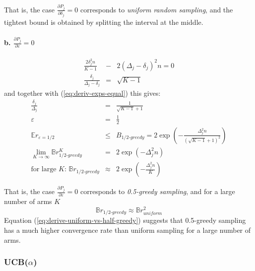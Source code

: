 \documentclass{article}
\newcommand {\IE} {\ensuremath {\mathbb{E}}}
\begin{document}
That is, the case $\frac {\partial P_j} {\partial \delta_j}=0$
corresponds to \emph{uniform random sampling}, and the tightest bound is obtained
by splitting the interval at the middle.


\paragraph{b. {\large $\frac {\partial P_j} {\partial \varepsilon}=0$}}

\begin{eqnarray*}
\frac {2\delta_j^2 n} {K-1}
  &-& 2(\Delta_j-\delta_j)^2n=0\\
\frac {\delta_j} {\Delta_j-\delta_j}&=&\sqrt {K-1}
\end{eqnarray*}
and together with (\ref{eq:deriv-exps-equal}) this gives:
\begin{eqnarray}
\frac {\delta_j} {\Delta_j}&=&\frac 1 {\sqrt {K-1}+1}\nonumber\\
\varepsilon&=&\frac 1 2\nonumber\\
\IE
r_{\varepsilon=1/2}&\le&B_{1/2\mbox{-}greedy}=2\exp\left(-\frac
  {\Delta_j^2n} {(\sqrt{K-1}+1)^2}\right)\nonumber\\
\lim_{K\to\infty}
\mathbb{B}r_{1/2\mbox{-}greedy}^K&=&2\exp\left(-{\Delta_j^2n}\right)\nonumber\\
\mbox{for large $K$: }\mathbb{B}r_{1/2\mbox{-}greedy}&\approx&2\exp\left(-\frac {\Delta_j^2n} K\right)
\label{eq:deriv-half-greedy-sampling}
\end{eqnarray}

That is, the case $\frac {\partial P_j} {\partial \varepsilon}=0$
corresponds to \emph{0.5-greedy sampling}, and for a large number of
arms $K$ 
\begin{equation}
\mathbb{B}r_{1/2\mbox{-}greedy}\approx \mathbb{B}r_{uniform}^2
\label{eq:derive-uniform-vs-half-greedy}
\end{equation}
Equation (\ref{eq:derive-uniform-vs-half-greedy}) suggests that
0.5-greedy sampling has a much higher convergence rate than uniform
sampling for a large number of arms.

\subsubsection{UCB($\alpha$)}
\label{app:derivations-asym-ucb}
\end{document}
